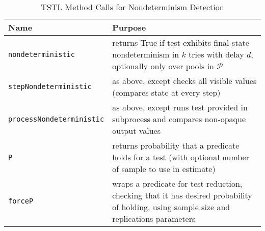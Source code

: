 \begin{table*}
\centering
{\scriptsize 

\caption{TSTL Method Calls for Nondeterminism Detection}
\label{tab:methods}
\begin{tabular}{l|l}
Name & Purpose \\
\hline
\hline
{\tt nondeterministic} & returns True if test exhibits final state nondeterminism in $k$
  tries with delay $d$, optionally only over pools in $\mathcal{P}$\\
\hline
{\tt stepNondeterministic} & as above, except checks all visible values
                       (compares state at every step)\\
\hline
{\tt processNondeterministic} & as above, except runs test provided in
                          subprocess and compares non-opaque output
                          values \\
\hline
{\tt P} & returns probability that a predicate holds for a test (with
          optional number of sample to use in estimate) \\
\hline
{\tt forceP} & wraps a predicate for test reduction, checking that it
               has desired probability of holding, using
         sample size and replications parameters \\
\hline
\hline

\end{tabular}
}
\end{table*}

